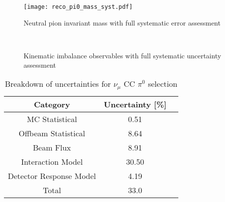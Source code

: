 \documentclass[../main.tex]{subfiles}
\begin{document}
\begin{figure}[H]
    \center
    \texttt{[image: reco\_pi0\_mass\_syst.pdf]}
    \caption[text]{Neutral pion invariant mass with full systematic error assessment}
    \label{fig:reco_pi0_mass_syst}
\end{figure}

\begin{figure}[H]
    \center
     \\
     \label{subfig:reco_dalphaT_syst}
    \caption{Kinematic imbalance observables with full systematic uncertainty assessment}
    \label{fig:tki_observables_syst}
\end{figure}

\begin{table}[H]
    \caption{Breakdown of uncertainties for $\nu_{\mu}$ CC $\pi^{0}$ selection}
    \vspace{0.1cm}
    \centering
    \begin{tabular}{ c c c } 
    \hline
    Category & Uncertainty [\%] \\
    \hline
    MC Statistical & 0.51 \\
    Offbeam Statistical & 8.64 \\ 
    Beam Flux & 8.91 \\
    Interaction Model & 30.50 \\
    Detector Response Model & 4.19 \\
    \hline
    Total & 33.0 \\
    \hline
    \end{tabular}
    \label{Tab:totaluncertainy}
\end{table}
\end{document}

